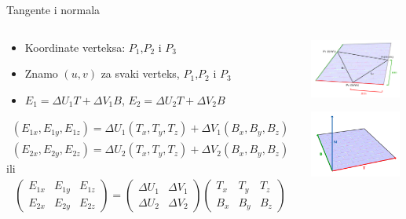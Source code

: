 \documentclass[9pt]{beamer}
\begin{document}
\begin{frame}{Tangente i normala}

	\begin{columns}
		\begin{column}{0.7\textwidth}
			\begin{itemize}
				\item Koordinate verteksa: $P_1$,$P_2$ i $P_3$
				\item Znamo $(u, v)$ za svaki verteks, $P_1$,$P_2$ i $P_3$
				\item $E_1 = \Delta U_1 T +\Delta V_1 B$, $E_2 = \Delta U_2 T +\Delta V_2 B$
			\end{itemize}
			\begin{align*}
			(E_{1x}, E_{1y}, E_{1z}) = \Delta U_1(T_x, T_y, T_z) + \Delta V_1(B_x, B_y, B_z) \\
			(E_{2x}, E_{2y}, E_{2z}) = \Delta U_2(T_x, T_y, T_z) + \Delta V_2(B_x, B_y, B_z)
			\end{align*}
			ili
			\begin{align*}
			\begin{pmatrix}
				E_{1x} & E_{1y} & E_{1z} \\
				E_{2x} & E_{2y} & E_{2z}
			\end{pmatrix}
			=
			\begin{pmatrix}
			\Delta U_1 & \Delta V_1 \\
			\Delta U_2 & \Delta V_2
			\end{pmatrix} 
			\begin{pmatrix}
			T_x & T_y &  T_z \\
			B_x & B_y &  B_z
			\end{pmatrix} 
			\end{align*}
		\end{column}
		\begin{column}{0.3\textwidth}
				\begin{center}
				\includegraphics[width=3cm]{slike/normal_mapping_surface_edges.png}
			\end{center}
			\begin{center}
				\includegraphics[width=3cm]{slike/normal_mapping_tbn_vectors.png}

\end{center}
\end{column}
\end{columns}
\end{frame}
\end{document}
